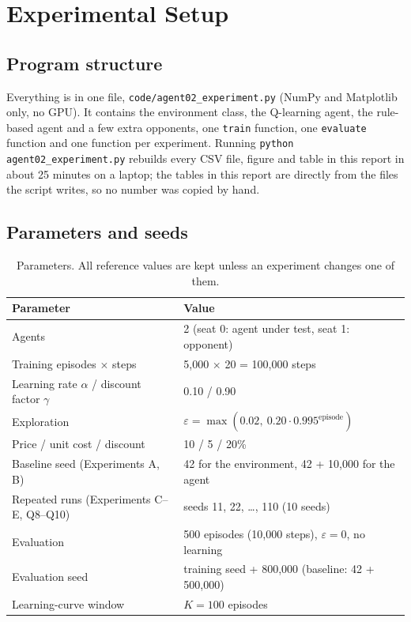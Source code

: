 \documentclass[11pt, a4paper]{article}
\newcommand{\code}[1]{\texttt{#1}}
\begin{document}
\section{Experimental Setup}
\label{sec:setup}

\subsection{Program structure}

Everything is in one file, \code{code/agent02\_experiment.py} (NumPy and Matplotlib only, no GPU). It contains the environment class, the Q-learning agent, the rule-based agent and a few extra opponents, one \code{train} function, one \code{evaluate} function and one function per experiment. Running \code{python agent02\_experiment.py} rebuilds every CSV file, figure and table in this report in about 25 minutes on a laptop; the tables in this report are \verb|| directly from the files the script writes, so no number was copied by hand.

\subsection{Parameters and seeds}

\begin{table}[H]
\centering
\caption{Parameters. All reference values are kept unless an experiment changes one of them.}
\begin{tabular}{ll}
\toprule
Parameter & Value \\
\midrule
Agents & 2 (seat 0: agent under test, seat 1: opponent) \\
Training episodes $\times$ steps & 5{,}000 $\times$ 20 = 100{,}000 steps \\
Learning rate $\alpha$ / discount factor $\gamma$ & 0.10 / 0.90 \\
Exploration & $\varepsilon = \max(0.02,\ 0.20 \cdot 0.995^{\text{episode}})$ \\
Price / unit cost / discount & 10 / 5 / 20\% \\
Baseline seed (Experiments A, B) & 42 for the environment, 42 + 10{,}000 for the agent \\
Repeated runs (Experiments C--E, Q8--Q10) & seeds 11, 22, \dots, 110 (10 seeds) \\
Evaluation & 500 episodes (10{,}000 steps), $\varepsilon = 0$, no learning \\
Evaluation seed & training seed + 800{,}000 (baseline: 42 + 500{,}000) \\
Learning-curve window & $K = 100$ episodes \\
\bottomrule
\end{tabular}
\end{table}
\end{document}
